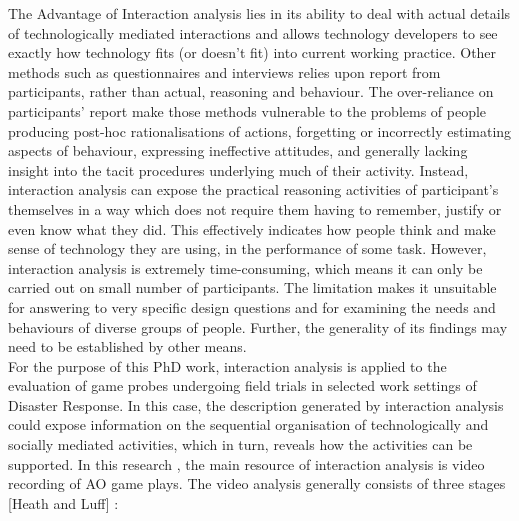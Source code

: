 The Advantage of Interaction analysis lies in its ability to deal with actual details of technologically mediated interactions and allows technology developers to see exactly how technology fits (or doesn't fit) into current working practice. Other methods such as questionnaires and interviews relies upon report from participants, rather than actual, reasoning and behaviour. The over-reliance on participants' report make those methods vulnerable to the problems of people producing post-hoc rationalisations of actions, forgetting or incorrectly estimating aspects of behaviour, expressing ineffective attitudes, and generally lacking insight into the tacit procedures underlying much of their activity. Instead, interaction analysis can expose the practical reasoning activities of participant's themselves in a way which does not require them having to remember, justify or even know what they did. This effectively indicates how people think and make sense of technology they are using, in the performance of some task. However, interaction analysis is extremely time-consuming, which means it can only be carried out on small number of participants. The limitation makes it unsuitable for answering to very specific design questions and for examining the needs and behaviours of diverse groups of people. Further, the generality of its findings may need to be established by other means.\\

For the purpose of this PhD work, interaction analysis is applied to the evaluation of game probes undergoing field trials in selected work settings of Disaster Response. In this case, the description generated by interaction analysis could expose information on the sequential organisation of technologically and socially mediated activities, which in turn, reveals how the activities can be supported. In this research , the main resource of interaction analysis is video recording of AO game plays. The video analysis generally consists of three stages [Heath and Luff] :

